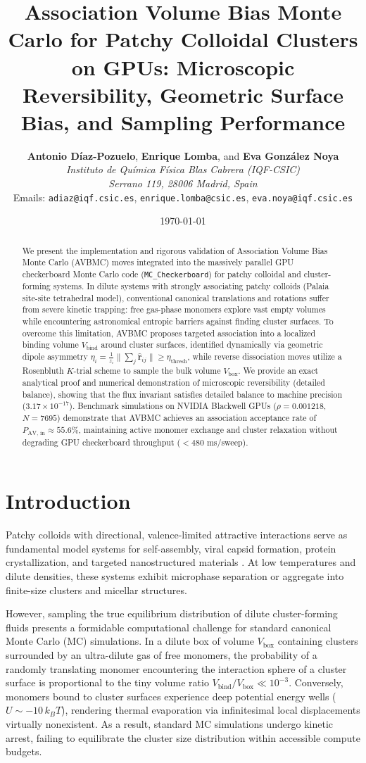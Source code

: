 \documentclass[11pt,a4paper]{article}
\title{\textbf{Association Volume Bias Monte Carlo for Patchy Colloidal Clusters on GPUs: Microscopic Reversibility, Geometric Surface Bias, and Sampling Performance}}
\author{
    \textbf{Antonio D\'{i}az-Pozuelo}, \textbf{Enrique Lomba}, and \textbf{Eva Gonz\'{a}lez Noya}\\[0.5em]
    \textit{Instituto de Qu\'{i}mica F\'{i}sica Blas Cabrera (IQF-CSIC)}\\
    \textit{Serrano 119, 28006 Madrid, Spain}\\[0.3em]
    \small Emails: \texttt{adiaz@iqf.csic.es}, \texttt{enrique.lomba@csic.es}, \texttt{eva.noya@iqf.csic.es}
}
\date{\today}
\begin{document}
\maketitle

\begin{abstract}
We present the implementation and rigorous validation of Association Volume Bias Monte Carlo (AVBMC) moves integrated into the massively parallel GPU checkerboard Monte Carlo code (\texttt{MC\_Checkerboard}) for patchy colloidal and cluster-forming systems. In dilute systems with strongly associating patchy colloids (Palaia site-site tetrahedral model), conventional canonical translations and rotations suffer from severe kinetic trapping: free gas-phase monomers explore vast empty volumes while encountering astronomical entropic barriers against finding cluster surfaces. To overcome this limitation, AVBMC proposes targeted association into a localized binding volume $V_{\text{bind}}$ around cluster surfaces, identified dynamically via geometric dipole asymmetry $\eta_i = \frac{1}{z_i}\|\sum_{j}\hat{\mathbf{r}}_{ij}\| \ge \eta_{\text{thresh}}$, while reverse dissociation moves utilize a Rosenbluth $K$-trial scheme to sample the bulk volume $V_{\text{box}}$. We provide an exact analytical proof and numerical demonstration of microscopic reversibility (detailed balance), showing that the flux invariant satisfies detailed balance to machine precision ($3.17 \times 10^{-17}$). Benchmark simulations on NVIDIA Blackwell GPUs ($\rho = 0.001218$, $N=7695$) demonstrate that AVBMC achieves an association acceptance rate of $P_{\text{AV, in}} \approx 55.6\%$, maintaining active monomer exchange and cluster relaxation without degrading GPU checkerboard throughput ($< 480$ ms/sweep).
\end{abstract}

\section{Introduction}
Patchy colloids with directional, valence-limited attractive interactions serve as fundamental model systems for self-assembly, viral capsid formation, protein crystallization, and targeted nanostructured materials \cite{palaia2022,noya2014,bianchi2006}. At low temperatures and dilute densities, these systems exhibit microphase separation or aggregate into finite-size clusters and micellar structures. 

However, sampling the true equilibrium distribution of dilute cluster-forming fluids presents a formidable computational challenge for standard canonical Monte Carlo (MC) simulations. In a dilute box of volume $V_{\text{box}}$ containing clusters surrounded by an ultra-dilute gas of free monomers, the probability of a randomly translating monomer encountering the interaction sphere of a cluster surface is proportional to the tiny volume ratio $V_{\text{bind}} / V_{\text{box}} \ll 10^{-3}$. Conversely, monomers bound to cluster surfaces experience deep potential energy wells ($U \sim -10\,k_B T$), rendering thermal evaporation via infinitesimal local displacements virtually nonexistent. As a result, standard MC simulations undergo kinetic arrest, failing to equilibrate the cluster size distribution within accessible compute budgets.
\end{document}
